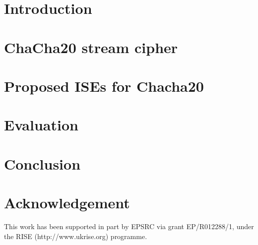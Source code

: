 \documentclass[conference]{IEEEtran}
\begin{document}

\section{Introduction}
\label{sec:intro}


\section{ChaCha20 stream cipher}
\label{sec:bg}


\section{Proposed ISEs for Chacha20}
\label{sec:ise}


\section{Evaluation}
\label{sec:res}


\section{Conclusion}
\label{sec:outro}


\section*{Acknowledgement}
	This work has been supported in part by EPSRC via grant EP/R012288/1,
	under the RISE (http://www.ukrise.org) programme.



%
%
%




%
\end{document}
